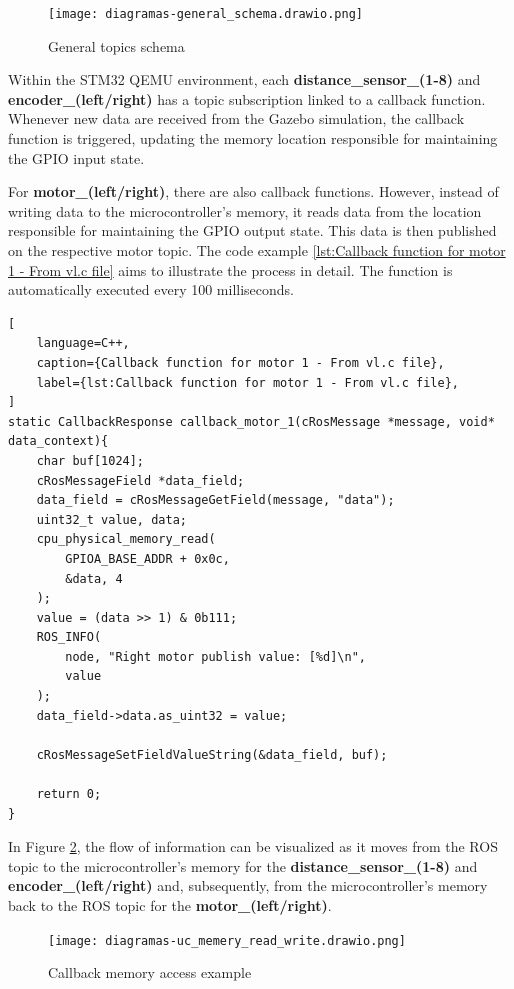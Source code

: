 \documentclass[../../monografia.tex]{subfiles}
\begin{document}
\begin{figure}[h!]
    \centering
    \caption{General topics schema}
    \texttt{[image: diagramas-general\_schema.drawio.png]}
    \label{fig: General topics schema}
\end{figure}

Within the STM32 QEMU environment, each \textbf{distance\_sensor\_(1-8)} and \textbf{encoder\_(left/right)} has a topic subscription linked to a callback function. Whenever new data are received from the Gazebo simulation, the callback function is triggered, updating the memory location responsible for maintaining the GPIO input state.

For \textbf{motor\_(left/right)}, there are also callback functions. However, instead of writing data to the microcontroller's memory, it reads data from the location responsible for maintaining the GPIO output state. This data is then published on the respective motor topic. The code example \ref{lst:Callback function for motor 1 - From vl.c file} aims to illustrate the process in detail. The function is automatically executed every 100 milliseconds. 

\clearpage

\begin{lstlisting}[
    language=C++,
    caption={Callback function for motor 1 - From vl.c file},
    label={lst:Callback function for motor 1 - From vl.c file},
]
static CallbackResponse callback_motor_1(cRosMessage *message, void* data_context){
    char buf[1024];
    cRosMessageField *data_field;
    data_field = cRosMessageGetField(message, "data");
    uint32_t value, data;
    cpu_physical_memory_read(
        GPIOA_BASE_ADDR + 0x0c, 
        &data, 4
    );
    value = (data >> 1) & 0b111;
    ROS_INFO(
        node, "Right motor publish value: [%d]\n", 
        value
    );
    data_field->data.as_uint32 = value;

    cRosMessageSetFieldValueString(&data_field, buf);

    return 0;
}
\end{lstlisting}


In Figure \ref{fig: Callback Memory access example}, the flow of information can be visualized as it moves from the ROS topic to the microcontroller's memory for the \textbf{distance\_sensor\_(1-8)} and \textbf{encoder\_(left/right)} and, subsequently, from the microcontroller's memory back to the ROS topic for the \textbf{motor\_(left/right)}.

\begin{figure}[h!]
    \centering
    \caption{Callback memory access example}
    \texttt{[image: diagramas-uc\_memery\_read\_write.drawio.png]}
    \label{fig: Callback Memory access example}
\end{figure}



\end{document}
